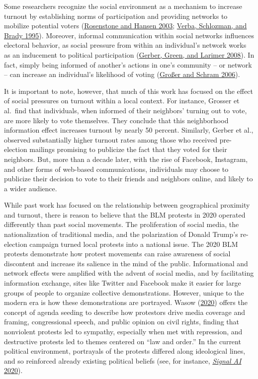 \documentclass[
  12pt,
]{article}
\begin{document}
Some researchers recognize the social environment as a mechanism to increase turnout by establishing norms of participation and providing networks to mobilize potential voters (\protect\hyperlink{ref-Rosenstone2003}{Rosenstone and Hansen 2003}; \protect\hyperlink{ref-Verba1995}{Verba, Schlozman, and Brady 1995}). Moreover, informal communication within social networks influences electoral behavior, as social pressure from within an individual's network works as an inducement to political participation (\protect\hyperlink{ref-Gerber2008}{Gerber, Green, and Larimer 2008}). In fact, simply being informed of another's actions in one's community -- or network -- can increase an individual's likelihood of voting (\protect\hyperlink{ref-Grosser2006}{Großer and Schram 2006}).

It is important to note, however, that much of this work has focused on the effect of social pressures on turnout within a local context. For instance, Grosser et al.~find that individuals, when informed of their neighbors' turning out to vote, are more likely to vote themselves. They conclude that this neighborhood information effect increases turnout by nearly 50 percent. Similarly, Gerber et al., observed substantially higher turnout rates among those who received pre-election mailings promising to publicize the fact that they voted for their neighbors. But, more than a decade later, with the rise of Facebook, Instagram, and other forms of web-based communications, individuals may choose to publicize their decision to vote to their friends and neighbors online, and likely to a wider audience.

While past work has focused on the relationship between geographical proximity and turnout, there is reason to believe that the BLM protests in 2020 operated differently than past social movements. The proliferation of social media, the nationalization of traditional media, and the polarization of Donald Trump's re-election campaign turned local protests into a national issue. The 2020 BLM protests demonstrate how protest movements can raise awareness of social discontent and increase its salience in the mind of the public. Informational and network effects were amplified with the advent of social media, and by facilitating information exchange, sites like Twitter and Facebook make it easier for large groups of people to organize collective demonstrations. However, unique to the modern era is how these demonstrations are portrayed. Wasow (\protect\hyperlink{ref-Wasow2020}{2020}) offers the concept of agenda seeding to describe how protestors drive media coverage and framing, congressional speech, and public opinion on civil rights, finding that nonviolent protests led to sympathy, especially when met with repression, and destructive protests led to themes centered on ``law and order.'' In the current political environment, portrayals of the protests differed along ideological lines, and so reinforced already existing political beliefs (see, for instance, \protect\hyperlink{ref-SignalAI2020}{\emph{Signal AI} 2020}).
\end{document}
